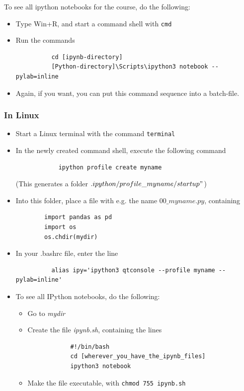 To see all ipython notebooks for the course, do the following:
\begin{itemize}
    \item Type Win+R, and start a command shell with \lstinline{cmd}
    \item Run the commands
        \begin{lstlisting}
          cd [ipynb-directory]
          [Python-directory]\Scripts\ipython3 notebook --pylab=inline
        \end{lstlisting}
    \item Again, if you want, you can put this command sequence into a batch-file.
\end{itemize}


\subsubsection{In Linux}

\begin{itemize}
  \item Start a Linux terminal with the command \lstinline{terminal}

  \item In the newly created command shell, execute the following command
        \begin{lstlisting}
            ipython profile create myname
        \end{lstlisting}
        (This generates a folder $.ipython/profile\_myname/startup"$)
  \item Into this folder, place a file with e.g. the name $00\_myname.py$, containing
        \begin{lstlisting}
        import pandas as pd
        import os
        os.chdir(mydir)
        \end{lstlisting}
  \item In your .bashrc file, enter the line
      \begin{lstlisting}
          alias ipy='ipython3 qtconsole --profile myname --pylab=inline'
      \end{lstlisting}
  \item To see all IPython notebooks, do the following:
    \begin{itemize}
      \item Go to \emph{mydir}
      \item Create the file \emph{ipynb.sh}, containing the lines
        \begin{lstlisting}
            #!/bin/bash
            cd [wherever_you_have_the_ipynb_files]
            ipython3 notebook
        \end{lstlisting}
      \item Make the file executable, with \lstinline{chmod 755 ipynb.sh}
    \end{itemize}
\end{itemize}

